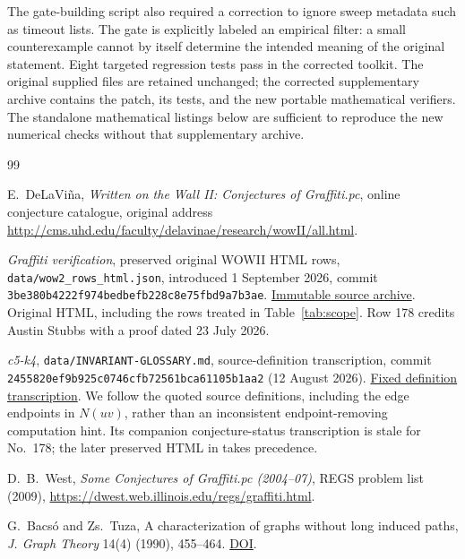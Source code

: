 \documentclass[11pt,a4paper]{article}
\theoremstyle{remark}
\begin{document}
The gate-building script also required a correction to ignore sweep
metadata such as timeout lists. The gate is explicitly labeled an
empirical filter: a small counterexample cannot by itself determine
the intended meaning of the original statement. Eight targeted regression
tests pass in the corrected toolkit. The original supplied files are
retained unchanged; the corrected supplementary archive contains the
patch, its tests, and the new portable mathematical verifiers.
The standalone mathematical listings below are sufficient to reproduce
the new numerical checks without that supplementary archive.

\begin{thebibliography}{99}\setlength{\itemsep}{2pt}\setlength{\parskip}{0pt}
\raggedright
{}
E.~DeLaVi\~na, \emph{Written on the Wall II: Conjectures of Graffiti.pc},
online conjecture catalogue, original address
\url{http://cms.uhd.edu/faculty/delavinae/research/wowII/all.html}.

\emph{Graffiti verification}, preserved original WOWII HTML rows,
\texttt{data/wow2\_rows\_html.json}, introduced 1 September 2026,
commit \texttt{3be380b4222f974bedbefb228c8e75fbd9a7b3ae}.
\href{https://gitlab.com/ai-village-agents/village/graffiti-verification/-/blob/3be380b4222f974bedbefb228c8e75fbd9a7b3ae/data/wow2_rows_html.json}{Immutable source archive}.
Original HTML, including the rows treated in Table~\ref{tab:scope}.
Row 178 credits Austin Stubbs with a proof dated 23 July 2026.

\emph{c5-k4}, \texttt{data/INVARIANT-GLOSSARY.md}, source-definition
transcription, commit \texttt{2455820ef9b925c0746cfb72561bca61105b1aa2}
(12 August 2026).
\href{https://github.com/Kuberwastaken/c5-k4/blob/2455820ef9b925c0746cfb72561bca61105b1aa2/data/INVARIANT-GLOSSARY.md}{Fixed definition transcription}.
We follow the quoted source definitions, including the edge endpoints in
$N(uv)$, rather than an inconsistent endpoint-removing computation hint.
Its companion conjecture-status transcription is stale for No.~178;
the later preserved HTML in \cite{Archive} takes precedence.

D.~B.~West, \emph{Some Conjectures of Graffiti.pc (2004--07)},
REGS problem list (2009),
\url{https://dwest.web.illinois.edu/regs/graffiti.html}.

 G.~Bacs\'o and Zs.~Tuza,
A characterization of graphs without long induced paths,
\emph{J. Graph Theory} 14(4) (1990), 455--464.
\href{https://doi.org/10.1002/jgt.3190140409}{DOI}.


\end{thebibliography}
\end{document}
